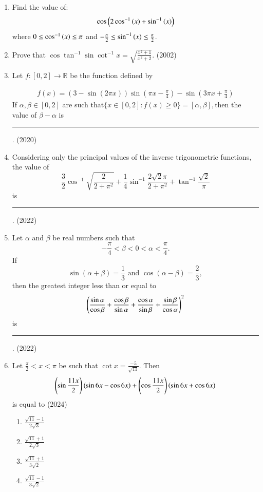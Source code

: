 \begin{enumerate}[label=\thesubsection.\arabic*,ref=\thesubsection.\theenumi]
\begin{enumerate}
\end{enumerate}
\item Find the value of: 
\begin{align*}
\cos \left(2\cos ^{-1}\left(x\right)+\sin ^{-1}\left(x\right)\right) 
\end{align*}
where $0\le \cos ^{-1}\left(x\right) \le \pi$ and $-\frac{\pi}{2}\le \sin ^{-1}\left(x\right) \le\frac{\pi}{2}$.
\hfill {}
	\item{
			Prove that $\cos \tan^{-1} \sin \cot^{-1} x = \sqrt{\frac{x^2 + 1}{x^2 + 2}}$. \hfill (2002)
		}
\item   Let $f: [0,2] \to \mathbb{R}$ be the function defined by

\begin{align*}
	f(x) = (3 - \sin (2\pi x) ) \sin (\pi x - \frac{\pi}{4}) - \sin (3\pi x + \frac{\pi}{4})
\end{align*}
If $\alpha, \beta \in [0,2]$ are such that$\{ x \in [0,2] : f(x) \geq 0 \} = [\alpha, \beta],$then the value of $\beta - \alpha$ is \rule{1cm}{0.1pt}.
		\hfill (2020)
 \item Considering only the principal values of the inverse trigonometric functions, the value of
	 $$\frac{3}{2} \cos^{-1} \sqrt{\frac{2}{2+\pi^{2}}} + \frac{1}{4} \sin^{-1}\frac{2\sqrt{2}\pi}{2+\pi^{2}} + \tan^{-1}\frac{\sqrt{2}}{\pi}$$
is \rule{1cm}{0.1pt}.
	\hfill (2022)
\item Let $\alpha$ and $\beta$ be real numbers such that $$-\frac{\pi}{4} < \beta < 0 < \alpha < \frac{\pi}{4}.$$ If $$\sin(\alpha + \beta) = \frac{1}{3} \text{ and } \cos(\alpha - \beta) = \frac{2}{3},$$
		then the greatest integer less than or equal to  $$\left(\frac{\sin \alpha}{\cos \beta} + \frac{\cos \beta}{\sin \alpha} + \frac{\cos \alpha}{\sin \beta} + \frac{\sin \beta}{\cos \alpha}\right)^2$$
is \rule{1cm}{0.1pt}.
\hfill (2022)
\item Let $ \frac{\pi}{2} < x < \pi $ be such that $ \cot x = \frac{-5}{\sqrt{11}} $. Then 
    \[
    \left( \sin \frac{11x}{2} \right) \left(\sin 6x - \cos 6x\right) + \left( \cos \frac{11x}{2} \right) \left(\sin 6x + \cos 6x\right)
    \]
    is equal to
\hfill (2024)
    \begin{multicols}{4}
\begin{enumerate}
\item $ \frac{\sqrt{11} - 1}{2\sqrt{3}} $
\item $ \frac{\sqrt{11} + 1}{2\sqrt{3}} $
\item $ \frac{\sqrt{11} + 1}{3\sqrt{2}} $
\item $ \frac{\sqrt{11} - 1}{3\sqrt{2}} $
    \end{enumerate}
\end{multicols}
\end{enumerate}
